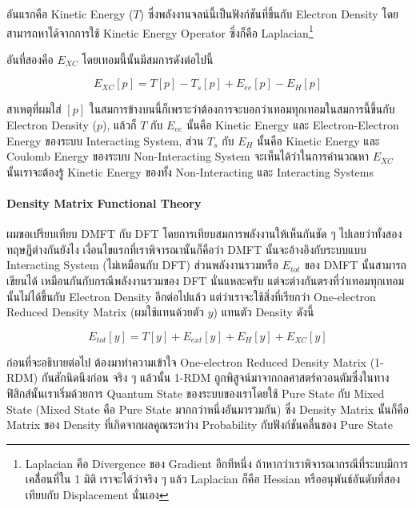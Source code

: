 อันแรกคือ Kinetic Energy ($T$) ซึ่งพลังงานจลน์นี้เป็นฟังก์ชันที่ขึ้นกับ Electron Density โดยสามารถหาได้จากการใช้ Kinetic Energy
Operator ซึ่งก็คือ Laplacian\footnote{Laplacian คือ Divergence ของ Gradient อีกทีหนึ่ง ถ้าหากว่าเราพิจารณากรณีที่ระบบมีการเคลื่้อนที่ใน
    1 มิติ เราจะได้ว่าจริง ๆ แล้ว Laplacian ก็คือ Hessian หรืออนุพันธ์อันดับที่สองเทียบกับ Displacement นั่นเอง}

อันที่สองคือ $E_{XC}$ โดยเทอมนี้นั้นมีสมการดังต่อไปนี้

\begin{equation}
    E_{XC}[p] = T[p]- T_{s}[p] + E_{ee}[p] - E_{H}[p]
\end{equation}

สาเหตุที่ผมใส่ $[p]$ ในสมการข้างบนนี้ก็เพราะว่าต้องการจะบอกว่าเทอมทุกเทอมในสมการนี้ขึ้นกับ Electron Density ($p$), แล้วก็ $T$ กับ
$E_{ee}$ นั้นคือ Kinetic Energy และ Electron-Electron Energy ของระบบ Interacting System, ส่วน $T_{s}$ กับ $E_{H}$
นั้นคือ Kinetic Energy และ Coulomb Energy ของระบบ Non-Interacting System จะเห็นได้ว่าในการคำนวณหา $E_{XC}$ นั้นเราจะต้องรู้
Kinetic Energy ของทั้ง Non-Interacting และ Interacting Systems

\paragraph{Density Matrix Functional Theory}

ผมขอเปรียบเทียบ DMFT กับ DFT โดยการเทียบสมการพลังงานให้เห็นกันชัด ๆ ไปเลยว่าทั้งสองทฤษฎีต่างกันยังไง เงื่อนไขแรกที่เราพิจารณานั้นก็คือว่า
DMFT นั้นจะอ้างอิงกับระบบแบบ Interacting System (ไม่เหมือนกับ DFT) ส่วนพลังงานรวมหรือ $E_{tot}$ ของ DMFT นั้นสามารถเขียนได้%
เหมือนกันกับกรณีพลังงานรวมของ DFT นั่นแหละครับ แต่จะต่างกันตรงที่ว่าเทอมทุกเทอมนั้นไม่ได้ขึ้นกับ Electron Density อีกต่อไปแล้ว
แต่ว่าเราจะใช้สิ่งที่เรียกว่า One-electron Reduced Density Matrix (ผมใช้แทนด้วยตัว $y$) แทนตัว Density ดังนี้

\begin{equation}
    E_{tot}[y] = T[y] + E_{ext}[y] + E_{H}[y] + E_{XC}[y]
\end{equation}

ก่อนที่จะอธิบายต่อไป ต้องมาทำความเข้าใจ One-electron Reduced Density Matrix (1-RDM) กันสักนิดนึงก่อน จริง ๆ แล้วนั้น 1-RDM
ถูกพิสูจน์มาจากกลศาสตร์ควอนตัมซึ่งในทางฟิสิกส์นั้นเราเริ่มด้วยการ Quantum State ของระบบของเราโดยใช้ Pure State กับ Mixed State
(Mixed State คือ Pure State มากกว่าหนึ่งอันมารวมกัน) ซึ่ง Density Matrix นั้นก็คือ Matrix ของ Density ที่เกิดจากผลคูณระหว่าง
Probability กับฟังก์ชันคลื่นของ Pure State

